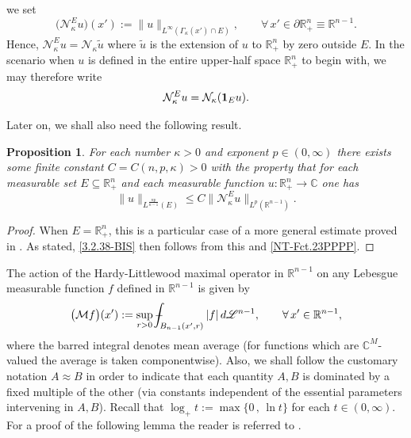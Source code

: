 \documentclass[11pt,reqno]{amsart}
\numberwithin{equation}{section}
\def\Xint#1{\mathchoice
   {\XXint\displaystyle\textstyle{#1}}%
   {\XXint\textstyle\scriptstyle{#1}}%
   {\XXint\scriptstyle\scriptscriptstyle{#1}}%
   {\XXint\scriptscriptstyle\scriptscriptstyle{#1}}%
   \!\int}
\def\XXint#1#2#3{{\setbox0=\hbox{$#1{#2#3}{\int}$}
     \vcenter{\hbox{$#2#3$}}\kern-.5\wd0}}
\def\aver#1{\Xint-_{#1}}
\newtheorem{proposition}[theorem]{Proposition}
\theoremstyle{remark}
\begin{document}
we set
%
\begin{equation}\label{NT-Fct.23}
\big({\mathcal{N}}^E_\kappa u\big)(x'):=\|u\|_{L^\infty(\Gamma_\kappa(x')\cap E)},\qquad
\forall\,x'\in\partial{\mathbb{R}}^{n}_{+}\equiv{\mathbb{R}}^{n-1}.
\end{equation}
%
Hence, ${\mathcal{N}}^E_\kappa u={\mathcal{N}}_\kappa\widetilde{u}$ 
where $\widetilde{u}$ is the extension of $u$ to ${\mathbb{R}}^n_{+}$
by zero outside $E$. In the scenario when $u$ is defined in 
the entire upper-half space ${\mathbb{R}}^n_{+}$ to begin with, we may 
therefore write 
%
\begin{equation}\label{NT-Fct.23PPPP}
{\mathcal{N}}^E_\kappa u={\mathcal{N}}_\kappa({\bf 1}_E u).
\end{equation}

Later on, we shall also need the following result.

\begin{proposition}\label{p3.2.6}
For each number $\kappa>0$ and exponent $p\in(0,\infty)$ there exists 
some finite constant $C=C(n,p,\kappa)>0$ with the property that 
for each measurable set $E\subseteq{\mathbb{R}}^n_{+}$ and 
each measurable function $u:{\mathbb{R}}^n_{+}\to{\mathbb{C}}$ one has
%
\begin{equation}\label{3.2.38-BIS}
\|u\|_{L^{\frac{np}{n-1}}(E)}
\leq C\big\|\mathcal{N}^E_\kappa u\big\|_{L^p({\mathbb{R}}^{n-1})}.
\end{equation}
\end{proposition}

\begin{proof}
When $E={\mathbb{R}}^n_{+}$, this is a particular case of a more general 
estimate proved in \cite[Proposition~3.24, p.\,2647]{HoMiTa10}. As stated, 
\eqref{3.2.38-BIS} then follows from this and \eqref{NT-Fct.23PPPP}.
\end{proof}

The action of the Hardy-Littlewood maximal operator in $\mathbb{R}^{n-1}$ 
on any Lebesgue measurable function $f$ defined in ${\mathbb{R}}^{n-1}$ is given by 
%
\begin{equation}\label{MMax}
\big(\mathcal{M}f\big)(x'):=\sup_{r>0}\aver{B_{n-1}(x',r)}|f|\,d{\mathscr{L}}^{n-1},\qquad 
\forall\,x'\in\mathbb{R}^{n-1},
\end{equation}
%
where the barred integral denotes mean average (for functions which are $\mathbb{C}^M$-valued
the average is taken componentwise). Also, we shall follow the customary notation
$A\approx B$ in order to indicate that each quantity $A,B$ is dominated by a fixed multiple
of the other (via constants independent of the essential parameters intervening in $A,B$).
Recall that $\log_{+}t:=\max\big\{0\,,\,\ln t\big\}$ for each $t\in(0,\infty)$.
For a proof of the following lemma the reader is referred to \cite[Lemma~2.1]{MMMM16}.
\end{document}
